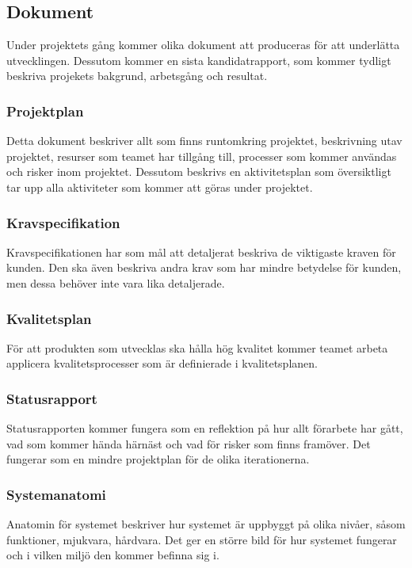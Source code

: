 \subsection{Dokument}
Under projektets gång kommer olika dokument att produceras för att underlätta utvecklingen.
Dessutom kommer en sista kandidatrapport, som kommer tydligt beskriva projekets bakgrund, arbetsgång och resultat.

\subsubsection*{Projektplan}
Detta dokument beskriver allt som finns runtomkring projektet, beskrivning utav projektet, 
resurser som teamet har tillgång till, processer som kommer användas och risker inom projektet.
Dessutom beskrivs en aktivitetsplan som översiktligt tar upp alla aktiviteter som kommer att
göras under projektet.

\subsubsection*{Kravspecifikation}
Kravspecifikationen har som mål att detaljerat beskriva de viktigaste kraven för kunden.
Den ska även beskriva andra krav som har mindre betydelse för kunden, men dessa behöver inte vara
lika detaljerade.

\subsubsection*{Kvalitetsplan}
För att produkten som utvecklas ska hålla hög kvalitet kommer teamet arbeta applicera kvalitetsprocesser som är definierade i kvalitetsplanen\cite{bib-kvalitetsplan}.

\subsubsection*{Statusrapport}
Statusrapporten kommer fungera som en reflektion på hur allt förarbete har gått, vad som kommer
hända härnäst och vad för risker som finns framöver. Det fungerar som en mindre projektplan för
de olika iterationerna.

\subsubsection*{Systemanatomi}
Anatomin för systemet beskriver hur systemet är uppbyggt på olika nivåer, såsom funktioner, 
mjukvara, hårdvara. Det ger en större bild för hur systemet fungerar och i vilken miljö den kommer
befinna sig i.

